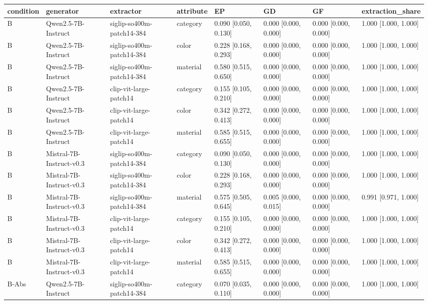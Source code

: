 \begin{tabular}{llllllll}
\toprule
condition & generator & extractor & attribute & EP & GD & GF & extraction\_share \\
\midrule
B & Qwen2.5-7B-Instruct & siglip-so400m-patch14-384 & category & 0.090 [0.050, 0.130] & 0.000 [0.000, 0.000] & 0.000 [0.000, 0.000] & 1.000 [1.000, 1.000] \\
B & Qwen2.5-7B-Instruct & siglip-so400m-patch14-384 & color & 0.228 [0.168, 0.293] & 0.000 [0.000, 0.000] & 0.000 [0.000, 0.000] & 1.000 [1.000, 1.000] \\
B & Qwen2.5-7B-Instruct & siglip-so400m-patch14-384 & material & 0.580 [0.515, 0.650] & 0.000 [0.000, 0.000] & 0.000 [0.000, 0.000] & 1.000 [1.000, 1.000] \\
B & Qwen2.5-7B-Instruct & clip-vit-large-patch14 & category & 0.155 [0.105, 0.210] & 0.000 [0.000, 0.000] & 0.000 [0.000, 0.000] & 1.000 [1.000, 1.000] \\
B & Qwen2.5-7B-Instruct & clip-vit-large-patch14 & color & 0.342 [0.272, 0.413] & 0.000 [0.000, 0.000] & 0.000 [0.000, 0.000] & 1.000 [1.000, 1.000] \\
B & Qwen2.5-7B-Instruct & clip-vit-large-patch14 & material & 0.585 [0.515, 0.655] & 0.000 [0.000, 0.000] & 0.000 [0.000, 0.000] & 1.000 [1.000, 1.000] \\
B & Mistral-7B-Instruct-v0.3 & siglip-so400m-patch14-384 & category & 0.090 [0.050, 0.130] & 0.000 [0.000, 0.000] & 0.000 [0.000, 0.000] & 1.000 [1.000, 1.000] \\
B & Mistral-7B-Instruct-v0.3 & siglip-so400m-patch14-384 & color & 0.228 [0.168, 0.293] & 0.000 [0.000, 0.000] & 0.000 [0.000, 0.000] & 1.000 [1.000, 1.000] \\
B & Mistral-7B-Instruct-v0.3 & siglip-so400m-patch14-384 & material & 0.575 [0.505, 0.645] & 0.005 [0.000, 0.015] & 0.000 [0.000, 0.000] & 0.991 [0.971, 1.000] \\
B & Mistral-7B-Instruct-v0.3 & clip-vit-large-patch14 & category & 0.155 [0.105, 0.210] & 0.000 [0.000, 0.000] & 0.000 [0.000, 0.000] & 1.000 [1.000, 1.000] \\
B & Mistral-7B-Instruct-v0.3 & clip-vit-large-patch14 & color & 0.342 [0.272, 0.413] & 0.000 [0.000, 0.000] & 0.000 [0.000, 0.000] & 1.000 [1.000, 1.000] \\
B & Mistral-7B-Instruct-v0.3 & clip-vit-large-patch14 & material & 0.585 [0.515, 0.655] & 0.000 [0.000, 0.000] & 0.000 [0.000, 0.000] & 1.000 [1.000, 1.000] \\
B-Abs & Qwen2.5-7B-Instruct & siglip-so400m-patch14-384 & category & 0.070 [0.035, 0.110] & 0.000 [0.000, 0.000] & 0.000 [0.000, 0.000] & 1.000 [1.000, 1.000] \\

\end{tabular}
